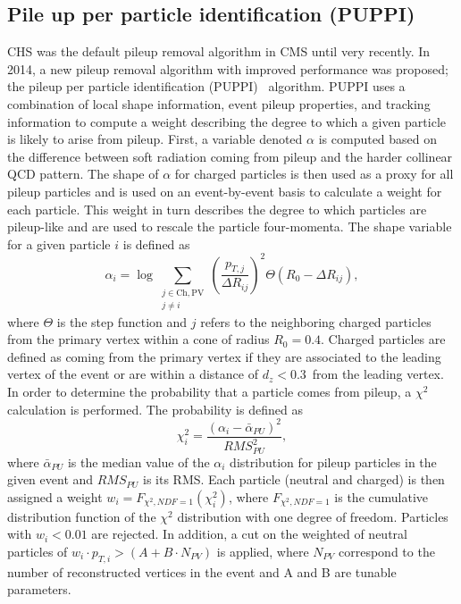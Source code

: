 \subsection{Pile up per particle identification (PUPPI)}
\label{subsub:objreco:puppi}
CHS was the default pileup removal algorithm in CMS until very recently. In 2014, a new pileup removal algorithm with improved performance was proposed; the pileup per particle identification (PUPPI)~\cite{Bertolini2014} algorithm.
PUPPI uses a combination of local shape information, event pileup properties, and tracking information to compute a weight describing the degree to which a given particle is likely to arise from pileup.
First, a variable denoted $\alpha$ is computed based on the difference between soft radiation coming from pileup and the harder collinear QCD pattern. The shape of $\alpha$ for charged particles is then used as a proxy for all pileup particles and is used on an event-by-event basis to calculate a weight for each particle. This weight in turn describes the degree to which particles are pileup-like and are used to rescale the particle four-momenta.
The shape variable for a given particle $i$ is defined as
\begin{equation}
  \alpha_i = \log \sum_{\substack{j \in \mathrm{Ch,PV} \\ j \neq i}} \left(\frac{p_{T,j}}{\Delta R_{ij}}\right)^{2} \Theta(R_0 - \Delta R_{ij}),
\end{equation}
where $\Theta$ is the step function and $j$ refers to the neighboring charged particles from the primary vertex within a cone of radius $R_0=0.4$. Charged particles are defined as coming from the primary vertex if they are associated to the leading vertex of the event or are within a distance of $d_z < $0.3~\cm from the leading vertex. 
In order to determine the probability that a particle comes from pileup, a $\chi^{2}$ calculation is performed. The probability is defined as
\begin{equation}
\chi^{2}_{i} = \frac{(\alpha_i -  \bar{\alpha}_{PU})^{2}}{RMS_{PU}^{2}},
\end{equation}
where $\bar{\alpha}_{PU}$ is the median value of the $\alpha_i$ distribution for pileup particles in the given event and $RMS_{PU}$ is its RMS.
Each particle (neutral and charged) is then assigned a weight $w_i = F_{\chi^2,NDF=1}(\chi^2_i)$, where $F_{\chi^2,NDF=1}$ is the cumulative distribution function of the $\chi^2$ distribution with one degree of freedom. Particles with $w_{i}<0.01$ are rejected.
In addition, a cut on the weighted \PT of neutral particles of $w_{i} \cdot p_{T,i} >  (A + B \cdot N_{PV})$ \GeV is applied, where $N_{PV}$ correspond to the number of reconstructed vertices in the event and A and B are tunable parameters. 
